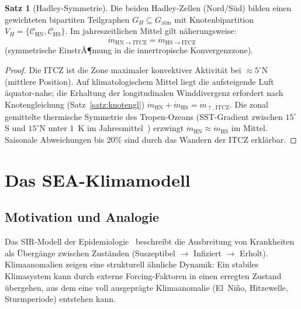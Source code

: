 ﻿\documentclass[a4paper,12pt]{article}
\theoremstyle{definition}
\newtheorem{satz}{Satz}
\begin{document}
\begin{satz}[Hadley-Symmetrie]
\label{satz:hadley}
Die beiden Hadley-Zellen (Nord/S\"ud) bilden einen gewichteten bipartiten Teilgraphen
$G_H \subseteq G_{\mathrm{atm}}$ mit Knotenbipartition
$V_H = \{\mathcal{C}_{\mathrm{HN}}, \mathcal{C}_{\mathrm{HS}}\}$.
Im jahreszeitlichen Mittel gilt n\"aherungsweise:
\[
\dot{m}_{\mathrm{HN} \to \mathrm{ITCZ}} = \dot{m}_{\mathrm{HS} \to \mathrm{ITCZ}}
\]
(symmetrische EinstrÃ¶mung in die innertropische Konvergenzzone).
\end{satz}

\begin{proof}
Die ITCZ ist die Zone maximaler konvektiver Aktivit\"at bei $\approx 5^\circ$N (mittlere Position).
Auf klimatologischem Mittel liegt die aufsteigende Luft \"aquator-nahe;
die Erhaltung der longitudinalen Winddivergenz erfordert nach Knotengleichung (Satz~\ref{satz:knotengl})
$\dot{m}_{\mathrm{HN}} + \dot{m}_{\mathrm{HS}} = \dot{m}_{\uparrow, \mathrm{ITCZ}}$.
Die zonal gemittelte thermische Symmetrie des Tropen-Ozeans (SST-Gradient zwischen
$15^\circ$S und $15^\circ$N unter $1$~K im Jahresmittel~\cite{hartmann2016}) erzwingt
$\dot{m}_{\mathrm{HN}} \approx \dot{m}_{\mathrm{HS}}$ im Mittel. Saisonale Abweichungen
bis $20\%$ sind durch das Wandern der ITCZ erkl\"arbar.
\end{proof}

\section{Das SEA-Klimamodell}

\subsection{Motivation und Analogie}

Das SIR-Modell der Epidemiologie~\cite{epp2026r0} beschreibt die Ausbreitung
von Krankheiten als \"Uberg\"ange zwischen Zust\"anden
(Suszeptibel $\to$ Infiziert $\to$ Erholt). Klimaanomalien zeigen eine strukturell
\"ahnliche Dynamik: Ein stabiles Klimasystem kann durch externe Forcing-Faktoren
in einen erregten Zustand \"ubergehen, aus dem eine voll ausgepr\"agte Klimaanomalie
(El~Ni\~no, Hitzewelle, Sturmperiode) entstehen kann.
\end{document}
